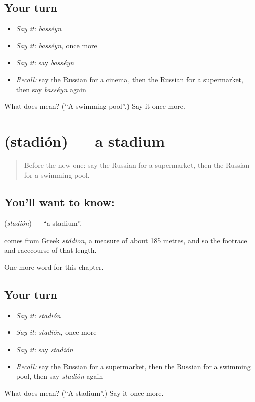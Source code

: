 \subsection*{Your turn}
\begin{itemize}
\raggedright
  \item \emph{Say it:} \emph{basséyn}
  \item \emph{Say it:} \emph{basséyn}, once more
  \item \emph{Say it:} say \emph{basséyn}
  \item \emph{Recall:} say the Russian for a cinema, then the Russian for a supermarket, then say \emph{basséyn} again
\end{itemize}

\begin{tcolorbox}[breakable,colback=teal!4,colframe=teal!35!black,title={Before you move on}]
What does  mean? (\textquotedblleft{}A swimming pool\textquotedblright{}.) Say it once more.
\end{tcolorbox}
\section[\texorpdfstring{\ru{стадион} (stadión)}{стадион (stadión)}]{ (stadión) — a stadium}

\label{lesson:RU-C88-stadium}



\begin{quote}
Before the new one: say the Russian for a supermarket, then the Russian for a swimming pool.
\end{quote}

\subsection*{You'll want to know: }
\textbf{} (\emph{stadión}) — \textquotedblleft{}a stadium\textquotedblright{}.

\begin{cousinweb}
\textbf{} comes from Greek \emph{stádion}, a measure of about 185 metres, and so the footrace and racecourse of that length.
\end{cousinweb}

\begin{grammarlens}[title={What you've built}]
One more word for this chapter.
\end{grammarlens}

\subsection*{Your turn}
\begin{itemize}
\raggedright
  \item \emph{Say it:} \emph{stadión}
  \item \emph{Say it:} \emph{stadión}, once more
  \item \emph{Say it:} say \emph{stadión}
  \item \emph{Recall:} say the Russian for a supermarket, then the Russian for a swimming pool, then say \emph{stadión} again
\end{itemize}

\begin{tcolorbox}[breakable,colback=teal!4,colframe=teal!35!black,title={Before you move on}]
What does  mean? (\textquotedblleft{}A stadium\textquotedblright{}.) Say it once more.
\end{tcolorbox}
